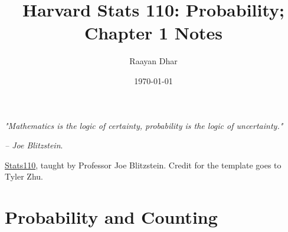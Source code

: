 \documentclass[11 pt]{scrartcl}
\begin{document}
 
\title{\Large Harvard Stats 110: Probability; Chapter 1 Notes}
\author{\large Raayan Dhar}
\date{\large\today}

\maketitle 

\begin{center}
\begin{displayquote}
    \emph{"Mathematics is the logic of certainty, probability is the logic of uncertainty."} \\ \begin{flushright} \emph{– Joe Blitzstein}.  \end{flushright}
\end{displayquote}
\end{center}


\href{https://projects.iq.harvard.edu/stat110/home}{Stats110}, taught by Professor Joe Blitzstein. Credit for the template goes to Tyler Zhu.

\tableofcontents 

\newpage

\section{Probability and Counting}
\end{document}
